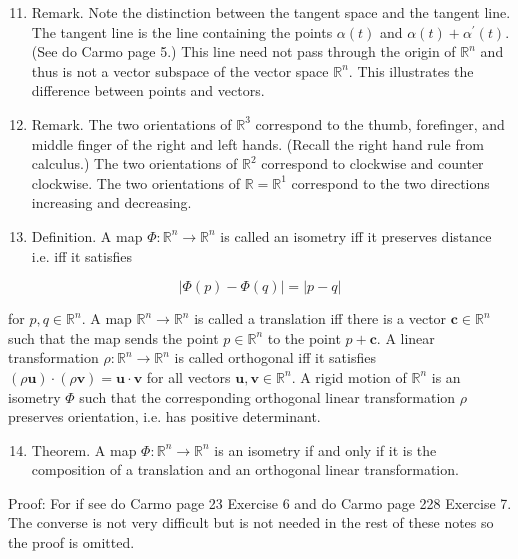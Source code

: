\documentclass[10pt]{article}
\begin{document}
\begin{enumerate}
  \setcounter{enumi}{10}
  \item Remark. Note the distinction between the tangent space and the tangent line. The tangent line is the line containing the points $\alpha(t)$ and $\alpha(t)+\alpha^{\prime}(t)$. (See do Carmo page 5.) This line need not pass through the origin of $\mathbb{R}^{n}$ and thus is not a vector subspace of the vector space $\mathbb{R}^{n}$. This illustrates the difference between points and vectors.

  \item Remark. The two orientations of $\mathbb{R}^{3}$ correspond to the thumb, forefinger, and middle finger of the right and left hands. (Recall the right hand rule from calculus.) The two orientations of $\mathbb{R}^{2}$ correspond to clockwise and counter clockwise. The two orientations of $\mathbb{R}=\mathbb{R}^{1}$ correspond to the two directions increasing and decreasing.

  \item Definition. A map $\Phi: \mathbb{R}^{n} \rightarrow \mathbb{R}^{n}$ is called an isometry iff it preserves distance i.e. iff it satisfies

\end{enumerate}

$$
|\Phi(p)-\Phi(q)|=|p-q|
$$

for $p, q \in \mathbb{R}^{n}$. A map $\mathbb{R}^{n} \rightarrow \mathbb{R}^{n}$ is called a translation iff there is a vector $\mathbf{c} \in \mathbb{R}^{n}$ such that the map sends the point $p \in \mathbb{R}^{n}$ to the point $p+\mathbf{c}$. A linear transformation $\rho: \mathbb{R}^{n} \rightarrow \mathbb{R}^{n}$ is called orthogonal iff it satisfies $(\rho \mathbf{u}) \cdot(\rho \mathbf{v})=\mathbf{u} \cdot \mathbf{v}$ for all vectors $\mathbf{u}, \mathbf{v} \in \mathbb{R}^{n}$. A rigid motion of $\mathbb{R}^{n}$ is an isometry $\Phi$ such that the corresponding orthogonal linear transformation $\rho$ preserves orientation, i.e. has positive determinant.

\begin{enumerate}
  \setcounter{enumi}{13}
  \item Theorem. A map $\Phi: \mathbb{R}^{n} \rightarrow \mathbb{R}^{n}$ is an isometry if and only if it is the composition of a translation and an orthogonal linear transformation.
\end{enumerate}

Proof: For if see do Carmo page 23 Exercise 6 and do Carmo page 228 Exercise 7. The converse is not very difficult but is not needed in the rest of these notes so the proof is omitted.
\end{document}
